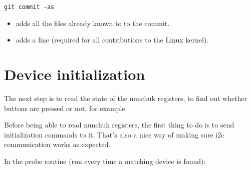 \begin{verbatim}
git commit -as
\end{verbatim}

\begin{itemize}
\item {} adds all the files already known to
       to the commit.
\item {} adds a  line (required
      for all contributions to the Linux kernel).
\end{itemize}

\section{Device initialization}

The next step is to read the state of the nunchuk registers, to find out
whether buttons are pressed or not, for example.

Before being able to read nunchuk registers, the first thing to do is
to send initialization commands to it. That's also a nice way of making
sure i2c communication works as expected.

In the probe routine (run every time a matching device is found):

